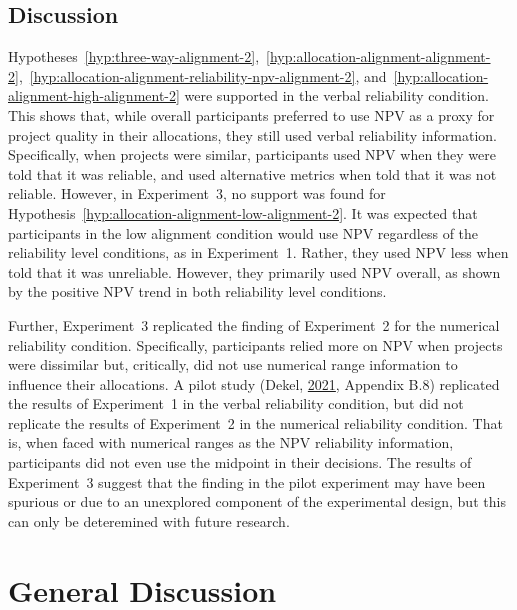 \documentclass[
  english,
  man, donotrepeattitle,floatsintext]{apa7}
\theoremstyle{definition}
\theoremstyle{definition}
\theoremstyle{definition}
\theoremstyle{definition}
\theoremstyle{remark}
\begin{document}
\hypertarget{discussion-2}{%
\subsection{Discussion}\label{discussion-2}}

Hypotheses~\ref{hyp:three-way-alignment-2},~\ref{hyp:allocation-alignment-alignment-2},~\ref{hyp:allocation-alignment-reliability-npv-alignment-2},
and~\ref{hyp:allocation-alignment-high-alignment-2} were supported in the
verbal reliability condition. This shows that, while overall participants
preferred to use NPV as a proxy for project quality in their allocations, they
still used verbal reliability information. Specifically, when projects were
similar, participants used NPV when they were told that it was reliable, and
used alternative metrics when told that it was not reliable. However, in
Experiment~3, no support was found for
Hypothesis~\ref{hyp:allocation-alignment-low-alignment-2}. It was expected that
participants in the low alignment condition would use NPV regardless of the
reliability level conditions, as in Experiment~1. Rather, they used NPV less
when told that it was unreliable. However, they primarily used NPV overall, as
shown by the positive NPV trend in both reliability level conditions.

Further, Experiment~3 replicated the finding of Experiment~2 for the numerical
reliability condition. Specifically, participants relied more on NPV when
projects were dissimilar but, critically, did not use numerical range
information to influence their allocations. A pilot study (Dekel, \protect\hyperlink{ref-dekel2021b}{2021},
Appendix B.8) replicated the results of Experiment~1 in the verbal reliability
condition, but did not replicate the results of Experiment~2 in the numerical
reliability condition. That is, when faced with numerical ranges as the NPV
reliability information, participants did not even use the midpoint in their
decisions. The results of Experiment~3 suggest that the finding in the pilot
experiment may have been spurious or due to an unexplored component of the
experimental design, but this can only be deteremined with future research.

\hypertarget{general-discussion}{%
\section{General Discussion}\label{general-discussion}}
\end{document}
